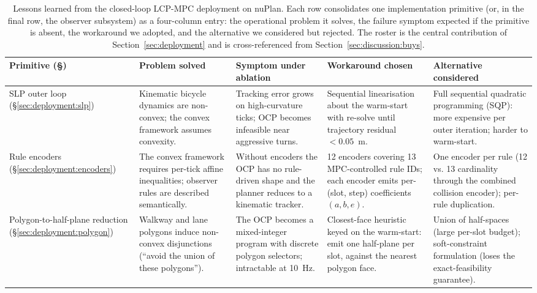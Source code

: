 \begin{table}[t]
    \centering
    \caption{Lessons learned from the closed-loop LCP-MPC deployment on nuPlan. Each row consolidates one implementation primitive (or, in the final row, the observer subsystem) as a four-column entry: the operational problem it solves, the failure symptom expected if the primitive is absent, the workaround we adopted, and the alternative we considered but rejected. The roster is the central contribution of Section~\ref{sec:deployment} and is cross-referenced from Section~\ref{sec:discussion:buys}.}
    \label{tab:lessons_learned}
    \footnotesize
    \begin{tabularx}{\linewidth}{@{}l X X X X@{}}
        \toprule
        Primitive (\S) & Problem solved & Symptom under ablation & Workaround chosen & Alternative considered \\
        \midrule
        SLP outer loop (\S\ref{sec:deployment:slp})
            & Kinematic bicycle dynamics are non-convex; the convex framework assumes convexity.
            & Tracking error grows on high-curvature ticks; OCP becomes infeasible near aggressive turns.
            & Sequential linearisation about the warm-start with re-solve until trajectory residual $< 0.05$~m.
            & Full sequential quadratic programming (SQP): more expensive per outer iteration; harder to warm-start. \\
        \midrule
        Rule encoders (\S\ref{sec:deployment:encoders})
            & The convex framework requires per-tick affine inequalities; observer rules are described semantically.
            & Without encoders the OCP has no rule-driven shape and the planner reduces to a kinematic tracker.
            & 12 encoders covering 13 MPC-controlled rule IDs; each encoder emits per-(slot, step) coefficients $(a, b, e)$.
            & One encoder per rule (12 vs. 13 cardinality through the combined collision encoder); per-rule duplication. \\
        \midrule
        Polygon-to-half-plane reduction (\S\ref{sec:deployment:polygon})
            & Walkway and lane polygons induce non-convex disjunctions (``avoid the union of these polygons'').
            & The OCP becomes a mixed-integer program with discrete polygon selectors; intractable at 10~Hz.
            & Closest-face heuristic keyed on the warm-start: emit one half-plane per slot, against the nearest polygon face.
            & Union of half-spaces (large per-slot budget); soft-constraint formulation (loses the exact-feasibility guarantee). \\

\end{tabularx}
\end{table}
